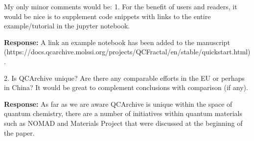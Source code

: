 My only minor comments would be:
1.	For the benefit of users and readers, it would be nice is to supplement code snippets with links to the entire example/tutorial in the jupyter notebook.

\textbf{Response:} A link an example notebook has been added to the manuscript (https://docs.qcarchive.molssi.org/projects/QCFractal/en/stable/quickstart.html).

2.	Is QCArchive unique? Are there any comparable efforts in the EU or perhaps in China? It would be great to complement conclusions with comparison (if any).

\textbf{Response:} As far as we are aware QCArchive is unique within the space of quantum chemistry, there are a number of initiatives within quantum materials such as NOMAD and Materials Project that were discussed at the beginning of the paper.